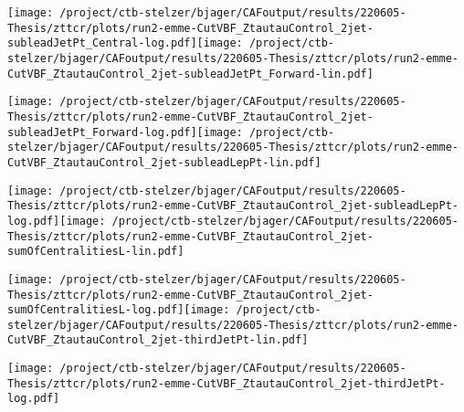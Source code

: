 \documentclass{article}
\begin{document}
\texttt{[image: /project/ctb-stelzer/bjager/CAFoutput/results/220605-Thesis/zttcr/plots/run2-emme-CutVBF\_ZtautauControl\_2jet-subleadJetPt\_Central-log.pdf]}\texttt{[image: /project/ctb-stelzer/bjager/CAFoutput/results/220605-Thesis/zttcr/plots/run2-emme-CutVBF\_ZtautauControl\_2jet-subleadJetPt\_Forward-lin.pdf]}

\texttt{[image: /project/ctb-stelzer/bjager/CAFoutput/results/220605-Thesis/zttcr/plots/run2-emme-CutVBF\_ZtautauControl\_2jet-subleadJetPt\_Forward-log.pdf]}\texttt{[image: /project/ctb-stelzer/bjager/CAFoutput/results/220605-Thesis/zttcr/plots/run2-emme-CutVBF\_ZtautauControl\_2jet-subleadLepPt-lin.pdf]}

\texttt{[image: /project/ctb-stelzer/bjager/CAFoutput/results/220605-Thesis/zttcr/plots/run2-emme-CutVBF\_ZtautauControl\_2jet-subleadLepPt-log.pdf]}\texttt{[image: /project/ctb-stelzer/bjager/CAFoutput/results/220605-Thesis/zttcr/plots/run2-emme-CutVBF\_ZtautauControl\_2jet-sumOfCentralitiesL-lin.pdf]}

\texttt{[image: /project/ctb-stelzer/bjager/CAFoutput/results/220605-Thesis/zttcr/plots/run2-emme-CutVBF\_ZtautauControl\_2jet-sumOfCentralitiesL-log.pdf]}\texttt{[image: /project/ctb-stelzer/bjager/CAFoutput/results/220605-Thesis/zttcr/plots/run2-emme-CutVBF\_ZtautauControl\_2jet-thirdJetPt-lin.pdf]}

\texttt{[image: /project/ctb-stelzer/bjager/CAFoutput/results/220605-Thesis/zttcr/plots/run2-emme-CutVBF\_ZtautauControl\_2jet-thirdJetPt-log.pdf]}
\end{document}
